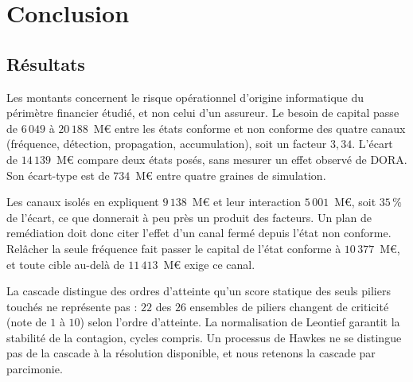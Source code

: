
\chapter*{Conclusion}
{}

\section*{Résultats}
Les montants concernent le risque opérationnel d'origine informatique du périmètre financier étudié, et non celui d'un assureur.
Le besoin de capital passe de $6\,049$ à $20\,188$~M\euro{} entre les états conforme et non conforme des quatre canaux (fréquence, détection, propagation, accumulation),
soit un facteur $3{,}34$. L'écart de $14\,139$~M\euro{} compare deux états posés, sans mesurer un effet observé de DORA.
Son écart-type est de $734$~M\euro{} entre quatre graines de simulation.

Les canaux isolés en expliquent
$9\,138$~M\euro{} et leur interaction $5\,001$~M\euro{}, soit $35\,\%$ de l'écart, ce que donnerait à
peu près un produit des facteurs. Un plan de remédiation doit donc citer l'effet d'un canal fermé
depuis l'état non conforme. Relâcher la seule fréquence fait passer le capital de l'état conforme à
$10\,377$~M\euro{}, et toute cible au-delà de $11\,413$~M\euro{} exige ce canal.

La cascade distingue des ordres d'atteinte qu'un score statique des seuls piliers touchés ne représente pas :
$22$ des $26$ ensembles de piliers changent de criticité (note de $1$ à $10$) selon l'ordre d'atteinte.
La normalisation de Leontief garantit la stabilité de la contagion, cycles compris. Un processus de Hawkes
ne se distingue pas de la cascade à la résolution disponible, et nous retenons la cascade par parcimonie.


